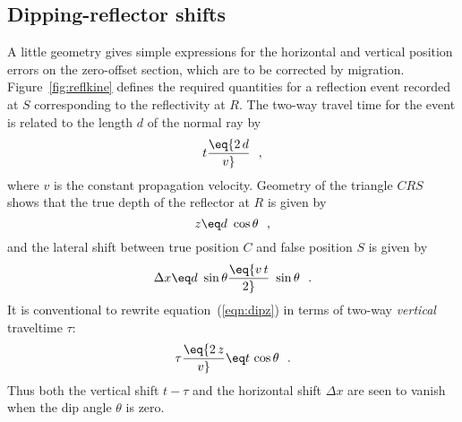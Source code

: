 \subsection{Dipping-reflector shifts}
\par
A little geometry gives simple expressions
for the horizontal and vertical position errors on the zero-offset section,
which are to be corrected by migration.
Figure~\ref{fig:reflkine} defines the
required quantities for a reflection event recorded at $S$ corresponding
to the reflectivity at $R$.  
%
%
The two-way travel time for the event is
related to the length $d$ of the normal ray by
\begin{equation}
t \eq {2\,d \over v}
\label{eqn:dipt0} \ \ ,
\end{equation}
where $v$ is the constant propagation velocity.
Geometry of the triangle $CRS$ shows
that the true depth of the reflector at $R$ is given by
\begin{equation}
z \eq d\ \cos\theta \ \ ,
\label{eqn:dipz}
\end{equation}
and the lateral shift between true position $C$ and false position $S$
is given by
\begin{equation}
\Delta x \eq d\ \sin\theta  \eq {v\,t \over 2}\ \sin\theta \ \ .
\label{eqn:dipdx}
\end{equation}
It is conventional to rewrite equation~(\ref{eqn:dipz}) in terms of two-way
{\em vertical} traveltime $\tau$:
\begin{equation}
\tau \eq {2\,z \over v} \eq t\, \cos\theta  \ \ .
\label{eqn:diptau}
\end{equation}
Thus both the vertical shift $t - \tau$ and the horizontal shift $\Delta x$
are seen to vanish when the dip angle $\theta$ is zero.  

